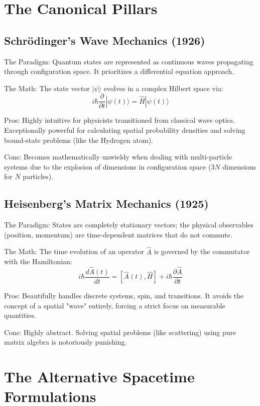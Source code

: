 \section{The Canonical Pillars}

\subsection{ Schrödinger’s Wave Mechanics (1926)}

The Paradigm: Quantum states are represented as continuous waves propagating
through configuration space. It prioritizes a differential equation approach.

The Math: The state vector $|\psi\rangle$ evolves in a complex Hilbert space via:
$$i\hbar \frac{\partial}{\partial t}|\psi(t)\rangle = \hat{H}|\psi(t)\rangle$$

Pros: Highly intuitive for physicists transitioned from classical wave optics.
Exceptionally powerful for calculating spatial probability densities and 
solving bound-state problems (like the Hydrogen atom).

Cons: Becomes mathematically unwieldy when dealing with multi-particle systems due
to the explosion of dimensions in configuration space 
($3N$ dimensions for $N$ particles).

\subsection{ Heisenberg’s Matrix Mechanics (1925)}
The Paradigm: States are completely stationary vectors; the physical observables
(position, momentum) are time-dependent matrices that do not commute.

The Math: The time evolution of an operator $\hat{A}$ is governed by 
the commutator with the Hamiltonian:
$$i\hbar \frac{d\hat{A}(t)}{dt} = [\hat{A}(t), \hat{H}] + i\hbar \frac{\partial \hat{A}}{\partial t}$$

Pros: Beautifully handles discrete systems, spin, and transitions. It avoids 
the concept of a spatial "wave" entirely, forcing a strict focus on measurable 
quantities.

Cons: Highly abstract. Solving spatial problems (like scattering) using pure 
matrix algebra is notoriously punishing.

\section{The Alternative Spacetime Formulations}

